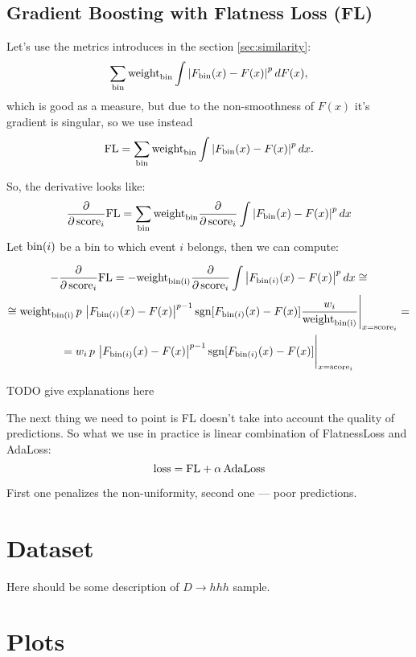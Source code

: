 \documentclass{JINST}
\theoremstyle{definition}
\theoremstyle{remark}
\newcommand{\abs}[1]{\left\vert#1\right\vert}
\newcommand{\sgn}{\operatorname{sgn}}
\begin{document}
\subsection{Gradient Boosting with Flatness Loss (FL)}

Let's use the metrics introduces in the section \ref{sec:similarity}:
\[
	\sum_{\bin} \binweight \int \abs{F_{\bin}(x) - F(x)}^p dF(x),
\]
which is good as a measure, but due to the non-smoothness of $F(x)$ it's 
gradient is singular, so we use instead
\[
	\FL = \sum_{\bin} \binweight \int \abs{F_{\bin}(x) - F(x)}^p dx.
\]

So, the derivative looks like:
\[
	\dfrac{\partial} {\partial \, \score_i} \FL
	= \sum_{\bin} \binweight \frac{\partial }{ \partial \, \score_i} 
			\int \abs{F_\bin(x) - F(x)}^p dx
\]
Let $\text{bin}(i)$ be a bin to which event $i$ belongs, then we can compute:
\def\binIweight{\text{weight}_\text{\bin(i)}}


\begin{multline*}
	- \dfrac{\partial} {\partial \, \score_i} \FL = 
		- \binIweight
		\frac{\partial }{ \partial \, \score_i} 
			\int \abs{F_{\bin(i)}(x) - F(x)}^p dx \cong \\
	\cong \binIweight \, p \,  \abs{F_{\bin(i)}(x) - F(x)}^{p-1} 
		\sgn[F_{\bin(i)}(x) - F(x)]
		\dfrac{w_i}{\binIweight}
		\Bigg|_{x=\score_i} = \\
	= 
		w_i \, p \,  \abs{F_{\bin(i)}(x) - F(x)}^{p-1}
		\sgn[F_{\bin(i)}(x) - F(x)]
		\Bigg|_{x=\score_i}
\end{multline*}

TODO give explanations here

The next thing we need to point is FL doesn't take into account the quality of predictions. So what we use in practice is linear combination of FlatnessLoss and AdaLoss:
\[
	\text{loss} = \text{FL} + \alpha \, \text{AdaLoss}
\]

First one penalizes the non-uniformity, second one --- poor predictions.

\section{Dataset}

Here should be some description of $D \to hhh$ sample.

\section{Plots}
\end{document}
